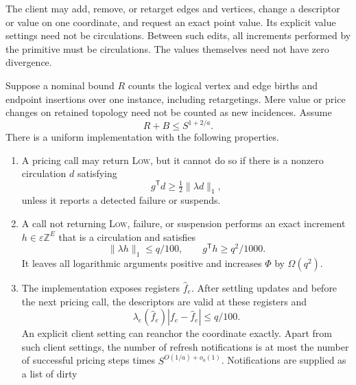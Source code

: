 The client may add, remove, or retarget edges and vertices, change a
descriptor or value on one coordinate, and request an exact point value.
Its explicit value settings need not be circulations.  Between such
edits, all increments performed by the primitive must be circulations.
The values themselves need not have zero divergence.

\begin{lemma}\label{lem:priced-steps}
Suppose a nominal bound $R$ counts the logical vertex and edge births and
endpoint insertions over one instance, including retargetings.  Mere
value or price changes on retained topology need not be counted as new
incidences.  Assume
\begin{equation}\label{engine:nominal-size}
                         R+B\le S^{1+2/a}.
\end{equation}
There is a uniform implementation with the following properties.
\begin{enumerate}[label=\textup{(\roman*)}]
\item A pricing call may return \textnormal{\textsc{Low}}, but it cannot do so if
there is a nonzero circulation $d$ satisfying
\begin{equation}\label{engine:high-direction}
                    g^{\mathsf T}d\ge\tfrac12\|\lambda d\|_1,
\end{equation}
unless it reports a detected failure or suspends.
\item A call not returning \textnormal{\textsc{Low}}, failure, or suspension performs
an exact increment $h\in\varepsilon\mathbb Z^E$ that is a circulation and
satisfies
\begin{equation}\label{engine:step-guarantee}
       \|\lambda h\|_1\le q/100,
       \qquad g^{\mathsf T}h\ge q^2/1000.
\end{equation}
It leaves all logarithmic arguments positive and increases $\Phi$ by
$\Omega(q^2)$.
\item The implementation exposes registers $\widehat f_e$.  After
settling updates and before the next pricing call, the descriptors are
valid at these registers and
\begin{equation}\label{engine:register-guarantee}
       \lambda_e(\widehat f_e)|f_e-\widehat f_e|\le q/100.
\end{equation}
An explicit client setting can reanchor the coordinate exactly.
Apart from such client settings, the number of refresh notifications is
at most the number of successful pricing steps times
$S^{O(1/a)+o_a(1)}$.  Notifications are supplied as a list of dirty

\end{enumerate}
\end{lemma}
